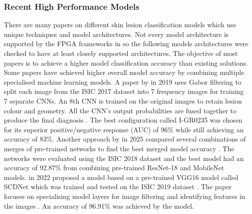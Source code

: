 \documentclass[12pt,nonacm,acmlarge,titlepage,screen]{acmart}
\begin{document}
		\subsubsection{Recent High Performance Models}
		There are many papers on different skin lesion classification models which use unique techniques and model architectures. Not every model architecture is supported by the FPGA frameworks in  so the following models architectures were checked to have at least closely supported architectures. The objective of most papers is to achieve a higher model classification accuracy than existing solutions.
		\\
		Some papers have achieved higher overall model accuracy by combining multiple specialised machine learning models. A paper by \citet{gabor_2019} in 2019 uses Gabor filtering to split each image from the ISIC 2017 dataset \cite{isic_2017} into 7 frequency images for training 7 separate CNNs. An 8th CNN is trained on the original images to retain lesion colour and geometry. All the CNN's output probabilities are fused together to produce the final diagnosis \cite{gabor_2019}. The best configuration called I-GR0235 was chosen for its superior positive/negative response (AUC) of 96\% while still achieving an accuracy of 83\%. Another approach by \citet{hybrid_2025} in 2025 compared several combinations of merges of pre-trained networks to find the best merged model accuracy \cite{hybrid_2025}. The networks were evaluated using the ISIC 2018 dataset \cite{isic_2018} and the best model had an accuracy of 92.87\% from combining pre-trained ResNet-18 and MobileNet models. \citet{scdnet_2022} in 2022 proposed a model based on a pre-trained VGG16 model called SCDNet which was trained and tested on the ISIC 2019 dataset \cite{isic_2019}. The paper focuses on specialising model layers for image filtering and identifying features in the images \cite{scdnet_2022}. An accuracy of 96.91\% was achieved by the model.
		
\end{document}

